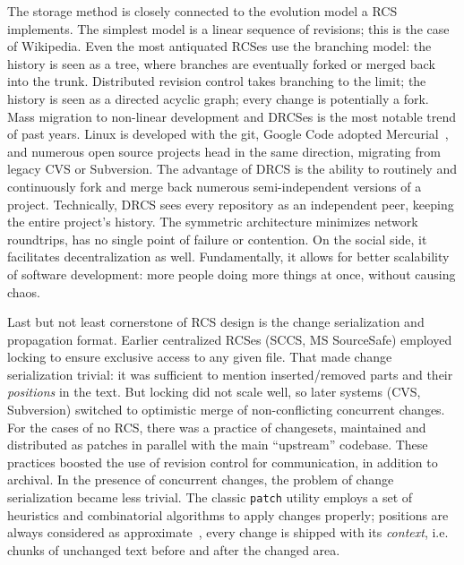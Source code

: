 \documentclass{sig-alternate}
\begin{document}
The storage method is closely connected to the evolution model a RCS implements.
The simplest model is a linear sequence of revisions; this is the case of Wikipedia.
Even the most antiquated RCSes use the branching model: the history is seen as a tree, where branches are eventually forked or merged back into the trunk.
Distributed revision control takes branching to the limit; the history is seen as a directed acyclic graph; every change is potentially a fork.
Mass migration to non-linear development and DRCSes is the most notable trend of past years.
Linux is developed with the git, Google Code adopted Mercurial~\cite{mercurial}, and numerous open source projects head in the same direction, migrating from legacy CVS or Subversion.
The advantage of DRCS is the ability to routinely and continuously fork and merge back numerous semi-independent versions of a project.
Technically, DRCS sees every repository as an independent peer, keeping the entire project's history. The symmetric architecture minimizes network roundtrips, has no single point of failure or contention.
On the social side, it facilitates decentralization as well.
Fundamentally, it allows for better scalability of software development: more people doing more things at once, without causing chaos.

Last but not least cornerstone of RCS design is the change serialization and propagation format.
Earlier centralized RCSes (SCCS, MS SourceSafe) employed locking to ensure exclusive access to any given file.
That made change serialization trivial: it was sufficient to mention inserted/removed parts and their \emph{positions} in the text.
But locking did not scale well, so later systems (CVS, Subversion) switched to optimistic merge of non-conflicting concurrent changes.
For the cases of no RCS, there was a practice of changesets, maintained and distributed as patches \cite{stdpatch} in parallel with the main ``upstream'' codebase.
These practices boosted the use of revision control for communication, in addition to archival. 
In the presence of concurrent changes, the problem of change serialization became less trivial.
The classic \verb+patch+ utility employs a set of heuristics and combinatorial algorithms to apply changes properly; positions are always considered as approximate~\cite{patch,fraser}, every change is shipped with its \emph{context}, i.e. chunks of unchanged text before and after the changed area.
\end{document}
